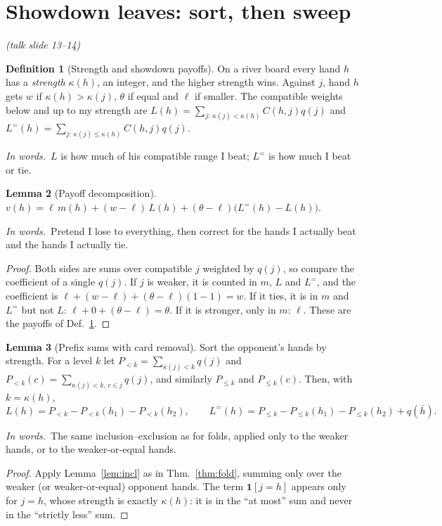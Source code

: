 \documentclass[11pt]{article}
\newcommand{\one}{\mathbf 1}
\theoremstyle{definition}
\newtheorem{definition}{Definition}[section]
\newtheorem{lemma}[definition]{Lemma}
\newcommand{\inwords}{\par\smallskip\noindent\textit{In words.}\ }
\newcommand{\Def}[1]{Def.~\ref{#1}}\newcommand{\Lem}[1]{Lemma~\ref{#1}}\newcommand{\Thm}[1]{Thm.~\ref{#1}}
\newcommand{\slide}[1]{\hfill{\small\itshape (talk slide #1)}}
\begin{document}
\section{Showdown leaves: sort, then sweep}\label{sec:show}\slide{13--14}
\begin{definition}[Strength and showdown payoffs]\label{def:strength}
On a river board every hand $h$ has a \emph{strength} $\kappa(h)$, an integer, and the higher strength wins. Against $j$, hand $h$
gets $w$ if $\kappa(h)>\kappa(j)$, $\theta$ if equal and $\ell$ if smaller. The compatible weights below and up to my strength are
$L(h)=\sum_{j:\,\kappa(j)<\kappa(h)}C(h,j)q(j)$ and $L^=(h)=\sum_{j:\,\kappa(j)\le\kappa(h)}C(h,j)q(j)$.
\inwords $L$ is how much of his compatible range I beat; $L^=$ is how much I beat or tie.
\end{definition}

\begin{lemma}[Payoff decomposition]\label{lem:showdecomp}
$v(h)=\ell\,m(h)+(w-\ell)\,L(h)+(\theta-\ell)\big(L^=(h)-L(h)\big)$.
\inwords Pretend I lose to everything, then correct for the hands I actually beat and the hands I actually tie.
\end{lemma}
\begin{proof}
Both sides are sums over compatible $j$ weighted by $q(j)$, so compare the coefficient of a single $q(j)$. If $j$ is weaker,
it is counted in $m$, $L$ and $L^=$, and the coefficient is $\ell+(w-\ell)+(\theta-\ell)(1-1)=w$. If it ties, it is in $m$ and
$L^=$ but not $L$: $\ell+0+(\theta-\ell)=\theta$. If it is stronger, only in $m$: $\ell$. These are the payoffs of \Def{def:strength}.
\end{proof}

\begin{lemma}[Prefix sums with card removal]\label{lem:sweep}
Sort the opponent's hands by strength. For a level $k$ let $P_{<k}=\sum_{\kappa(j)<k}q(j)$ and $P_{<k}(c)=\sum_{\kappa(j)<k,\,c\in j}q(j)$, and
similarly $P_{\le k}$ and $P_{\le k}(c)$. Then, with $k=\kappa(h)$,
\[ L(h)=P_{<k}-P_{<k}(h_1)-P_{<k}(h_2),\qquad L^=(h)=P_{\le k}-P_{\le k}(h_1)-P_{\le k}(h_2)+q(\bar h). \]
\inwords The same inclusion--exclusion as for folds, applied only to the weaker hands, or to the weaker-or-equal hands.
\end{lemma}
\begin{proof}
Apply \Lem{lem:incl} as in \Thm{thm:fold}, summing only over the weaker (or weaker-or-equal) opponent hands. The term
$\one[j=h]$ appears only for $j=h$, whose strength is exactly $\kappa(h)$: it is in the ``at most'' sum and never in the
``strictly less'' sum.
\end{proof}
\end{document}

